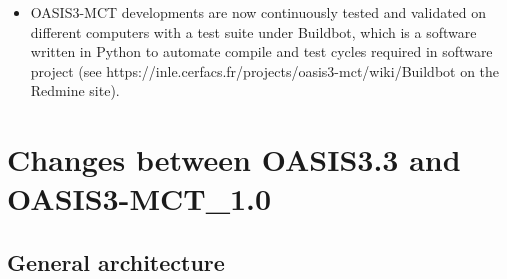 \begin{itemize}
\item OASIS3-MCT developments are now continuously tested and
  validated on different computers with a test suite under Buildbot,
  which is a software written in Python to automate compile and test
  cycles required in software project (see
  https://inle.cerfacs.fr/projects/oasis3-mct/wiki/Buildbot on the
  Redmine site).

\end{itemize}

\section{Changes between OASIS3.3 and OASIS3-MCT\_1.0}

\subsection{General architecture}
\label{sec_changes_gen}

